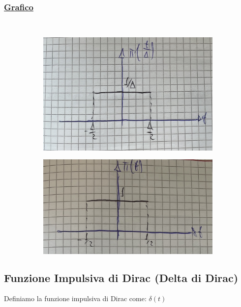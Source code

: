 \documentclass{article}
\begin{document}
\subsubsection{\underline{Grafico}} ~\\
\begin{figure}[ht]
  \begin{subfigure}{.5\textwidth}
  \centering
    \includegraphics[width=.9\linewidth]{images/10.Rett1.jpeg}
  \end{subfigure}
  \begin{subfigure}{.5\textwidth}
  \centering
    \includegraphics[width=.9\linewidth]{images/11.Rett2.jpeg}
  \end{subfigure}
\end{figure} 

\subsection{Funzione Impulsiva di Dirac (Delta di Dirac)}
Definiamo la funzione impulsiva di Dirac come: $\delta(t)$
\end{document}
